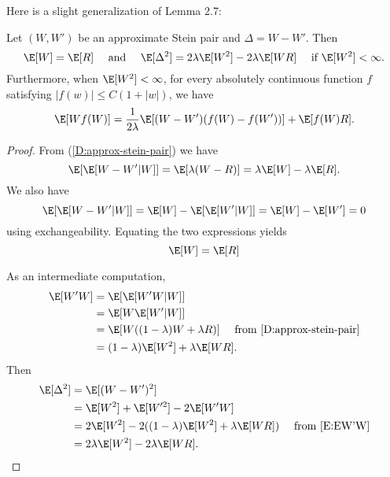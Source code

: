 Here is a slight generalization of Lemma 2.7:
\begin{lemma}
  Let $(W, W')$ be an approximate Stein pair and $\Delta = W - W'$.  Then 
  \begin{equation}
    \E [W] = \E [R] \quad \text{ and } \quad \E [\Delta^2] = 2 \lambda \E [W^2] - 2\lambda \E [WR]
    \quad \text{ if } \E [W^2] < \infty.
  \end{equation}
  Furthermore, when $\E [W^2] < \infty$, for every absolutely continuous function $f$ satisfying 
  $|f(w)| \leq C(1 + |w|)$, we have
  \begin{equation}
    \label{eq:expectation-w-f(w)}
    \E [Wf(W)] = \frac{1}{2\lambda} \E [(W-W')(f(W)-f(W'))] + \E [f(W)R].
  \end{equation}
\end{lemma}
\begin{proof}
  From (\ref{D:approx-stein-pair}) we have
  \begin{equation*}
    \E [\E [W-W'|W]] = \E [\lambda (W - R)] = \lambda \E [W] - \lambda \E [R].
  \end{equation*}
  We also have 
  \begin{equation*}
    \E [\E [W-W'|W]] = \E [W] - \E [\E [W' | W]] = \E [W] - \E [W'] = 0
  \end{equation*}
  using exchangeability.  Equating the two expressions yields
  \begin{equation*}
    \E [W] = \E [R]
  \end{equation*}
  
  As an intermediate computation,
  \begin{equation}
    \label{E:EW'W}
    \begin{split}
      \E [W'W] &= \E [\E [W'W|W]] \\
      &= \E [W \E [W'|W]] \\
      &= \E [W ((1-\lambda)W+\lambda R)] \quad \text{ from } \eqref{D:approx-stein-pair} \\
      &= (1-\lambda)\E [W^2] + \lambda \E [WR].
    \end{split}
  \end{equation}
  Then 
  \begin{equation}
    \begin{split}
      \E [\Delta^2] &= \E [(W-W')^2] \\
      &= \E [W^2] + \E [W'^2] - 2\E [W'W] \\
      &= 2 \E [W^2] - 2 ((1-\lambda)\E [W^2] + \lambda \E [WR]) \quad \text{ from } \eqref{E:EW'W}\\
      &= 2 \lambda \E [W^2] - 2\lambda \E [WR].
    \end{split}
  \end{equation}
  

\end{proof}
